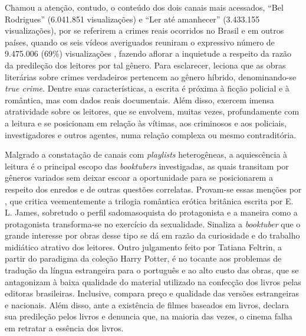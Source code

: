 \documentclass[portuguese]{textolivre}
\begin{document}
Chamou a atenção, contudo, o conteúdo dos dois canais mais acessados,
``Bel Rodrigues'' (6.041.851 visualizações) e ``Ler até amanhecer''
(3.433.155 visualizações), por se referirem a crimes reais ocorridos no
Brasil e em outros países, quando os seis vídeos averiguados reuniram o
expressivo número de 9.475.006 (69\%) visualizações \cite{rodrigues2021,rodriguesjoici2021}, 
fazendo aflorar a inquietude a respeito da
razão da predileção dos leitores por tal gênero. Para esclarecer,
\textcite{Browder2010} %
leciona que as obras literárias sobre crimes verdadeiros
pertencem ao gênero híbrido, denominando-se \emph{true crime}. Dentre
suas características, a escrita é próxima à ficção policial e à
romântica, mas com dados reais documentais. Além disso, exercem imensa
atratividade sobre os leitores, que se envolvem, muitas vezes,
profundamente com a leitura e se posicionam em relação às vítimas, aos
criminosos e aos policiais, investigadores e outros agentes, numa
relação complexa ou mesmo contraditória.

Malgrado a constatação de canais com \emph{playlists} heterogêneas, a
aquiescência à leitura é o principal escopo das \emph{booktubers}
investigadas, as quais transitam por gêneros variados sem deixar escoar
a oportunidade para se posicionarem a respeito dos enredos e de outras
questões correlatas. Provam-se essas menções por \textcite{feltrin2021}, %
que critica veementemente a trilogia romântica erótica britânica escrita por
E. L. James, sobretudo o perfil sadomasoquista do protagonista e a
maneira como a protagonista transforma-se no exercício da sexualidade.
Sinaliza a \emph{booktuber} que o grande interesse por obras desse tipo
se dá em razão da curiosidade e do trabalho midiático atrativo dos
leitores. Outro julgamento feito por Tatiana Feltrin, a partir do
paradigma da coleção Harry Potter, é no tocante aos problemas de
tradução da língua estrangeira para o português e ao alto custo das
obras, que se antagonizam à baixa qualidade do material utilizado na
confecção dos livros pelas editoras brasileiras. Inclusive, compara
preço e qualidade das versões estrangeiras e nacionais. Além disso, ante
a existência de filmes baseados em livros, declara sua predileção pelos
livros e denuncia que, na maioria das vezes, o cinema falha em retratar
a essência dos livros.
\end{document}
